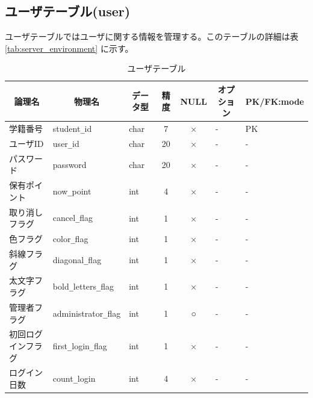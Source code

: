 \documentclass[a4j]{jarticle}
\begin{document}
 \subsection{ユーザテーブル(user)}
ユーザテーブルではユーザに関する情報を管理する。このテーブルの詳細は表\ref{tab:server_environment} に示す。
\begin{table}[h]
   \caption{ユーザテーブル}
  \begin{center}
    \footnotesize
    \begin{tabular}{|l|l|l|c|c|l|l|} \hline
       \multicolumn{1}{|c|}{論理名}&\multicolumn{1}{|c|}{物理名}&\multicolumn{1}{|c|}{データ型}&精度&NULL&\multicolumn{1}{|c|}{オプション}&\multicolumn{1}{|c|}{PK/FK:mode}\\\hline \hline
      学籍番号&student\verb|_|id&char&7&×&-&\multicolumn{1}{|l|}{PK} \\\hline
      ユーザID&user\verb|_|id&char&20&×&-&- \\ \hline
      パスワード&password&char&20&×&-&- \\ \hline
      保有ポイント&now\verb|_|point&int&4&×&-&- \\ \hline
      取り消しフラグ&cancel\verb|_|flag&int&1&×&-&- \\ \hline
      色フラグ&color\verb|_|flag&int&1&×&-&- \\ \hline
      斜線フラグ&diagonal\verb|_|flag&int&1&×&-&- \\ \hline
      太文字フラグ&bold\verb|_|letters\verb|_|flag&int&1&×&-&- \\ \hline
      管理者フラグ&administrator\verb|_|flag&int&1&○&-&- \\ \hline
      初回ログインフラグ&first\verb|_|login\verb|_|flag&int&1&×&-&- \\ \hline
      ログイン日数&count\verb|_|login&int&4&×&-&-\\ \hline
    \end{tabular}
   \label{tab:user}
  \end{center}
\end{table}
\end{document}
